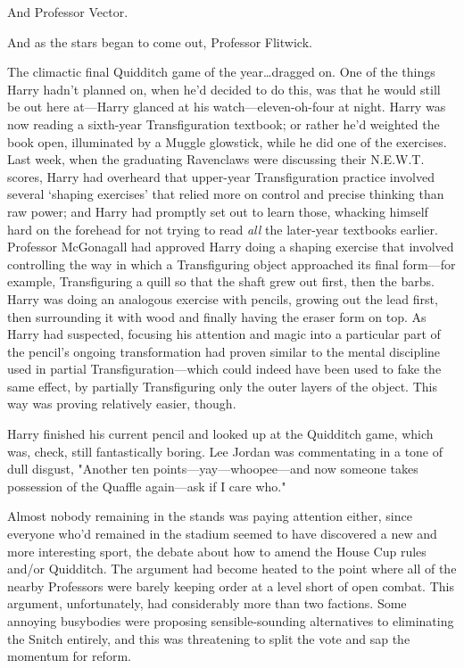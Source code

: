 And Professor Vector.

And as the stars began to come out, Professor Flitwick.

The climactic final Quidditch game of the year…dragged on.
\later
One of the things Harry hadn't planned on, when he'd decided to do this, was
that he would still be out here at—Harry glanced at his
watch—eleven-oh-four at night. Harry was now reading a sixth-year
Transfiguration textbook; or rather he'd weighted the book open, illuminated by
a Muggle glowstick, while he did one of the exercises. Last week, when the
graduating Ravenclaws were discussing their N.E.W.T. scores, Harry had
overheard that upper-year Transfiguration practice involved several `shaping
exercises' that relied more on control and precise thinking than raw power; and
Harry had promptly set out to learn those, whacking himself hard on the
forehead for not trying to read \emph{all} the later-year textbooks earlier.
Professor McGonagall had approved Harry doing a shaping exercise that involved
controlling the way in which a Transfiguring object approached its final
form—for example, Transfiguring a quill so that the shaft grew out first,
then the barbs. Harry was doing an analogous exercise with pencils, growing out
the lead first, then surrounding it with wood and finally having the eraser
form on top. As Harry had suspected, focusing his attention and magic into a
particular part of the pencil's ongoing transformation had proven similar to
the mental discipline used in partial Transfiguration—which could indeed have
been used to fake the same effect, by partially Transfiguring only the outer
layers of the object. This way was proving relatively easier, though.

Harry finished his current pencil and looked up at the Quidditch game, which
was, check, still fantastically boring. Lee Jordan was commentating in a tone
of dull disgust, "Another ten points—yay—whoopee—and now someone takes
possession of the Quaffle again—ask if I care who."

Almost nobody remaining in the stands was paying attention either, since
everyone who'd remained in the stadium seemed to have discovered a new and more
interesting sport, the debate about how to amend the House Cup rules and/or
Quidditch. The argument had become heated to the point where all of the nearby
Professors were barely keeping order at a level short of open combat. This
argument, unfortunately, had considerably more than two factions. Some annoying
busybodies were proposing sensible-sounding alternatives to eliminating the
Snitch entirely, and this was threatening to split the vote and sap the
momentum for reform.


